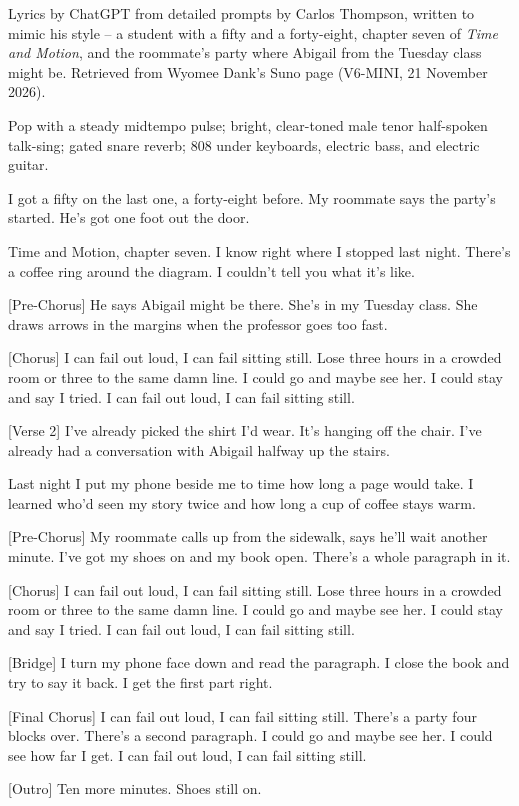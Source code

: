 \begin{notes}
Lyrics by ChatGPT from detailed prompts by Carlos Thompson, written to mimic his style -- a student with a fifty and a forty-eight, chapter seven of \emph{Time and Motion}, and the roommate's party where Abigail from the Tuesday class might be. Retrieved from Wyomee Dank's Suno page (V6-MINI, 21 November 2026).
\end{notes}
\begin{style}
Pop with a steady midtempo pulse; bright, clear-toned male tenor half-spoken talk-sing; gated snare reverb; 808 under keyboards, electric bass, and electric guitar.
\end{style}
\begin{lyrics}
[Verse 1]
I got a fifty on the last one,
a forty-eight before.
My roommate says the party’s started.
He’s got one foot out the door.

Time and Motion, chapter seven.
I know right where I stopped last night.
There’s a coffee ring around the diagram.
I couldn’t tell you what it’s like.

[Pre-Chorus]
He says Abigail might be there.
She’s in my Tuesday class.
She draws arrows in the margins
when the professor goes too fast.

[Chorus]
I can fail out loud,
I can fail sitting still.
Lose three hours in a crowded room
or three to the same damn line.
I could go and maybe see her.
I could stay and say I tried.
I can fail out loud,
I can fail sitting still.

[Verse 2]
I’ve already picked the shirt I’d wear.
It’s hanging off the chair.
I’ve already had a conversation
with Abigail halfway up the stairs.

Last night I put my phone beside me
to time how long a page would take.
I learned who’d seen my story twice
and how long a cup of coffee stays warm.

[Pre-Chorus]
My roommate calls up from the sidewalk,
says he’ll wait another minute.
I’ve got my shoes on and my book open.
There’s a whole paragraph in it.

[Chorus]
I can fail out loud,
I can fail sitting still.
Lose three hours in a crowded room
or three to the same damn line.
I could go and maybe see her.
I could stay and say I tried.
I can fail out loud,
I can fail sitting still.

[Bridge]
I turn my phone face down
and read the paragraph.
I close the book and try to say it back.
I get the first part right.

[Final Chorus]
I can fail out loud,
I can fail sitting still.
There’s a party four blocks over.
There’s a second paragraph.
I could go and maybe see her.
I could see how far I get.
I can fail out loud,
I can fail sitting still.

[Outro]
Ten more minutes.
Shoes still on.
\end{lyrics}

